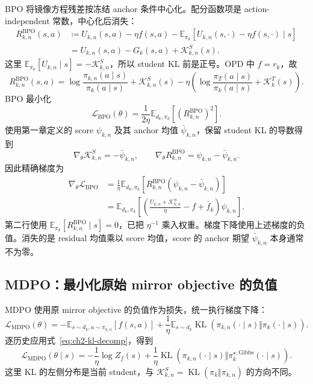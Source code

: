 BPO 将镜像方程残差按冻结 anchor 条件中心化。配分函数项是 action-independent 常数，中心化后消失：
\begin{align}
R_{k,n}^{\mathrm{BPO}}(s,a)
&\coloneqq U_{k,n}(s,a)-\eta f(s,a)
-\mathbb E_{\pi_k}[U_{k,n}(s,\cdot)-\eta f(s,\cdot)\mid s]
\label{eq:ch2-bpo-from-optimality}\\
&=U_{k,n}(s,a)-G_k(s,a)+\mathcal K_{k,n}^{S}(s).
\label{eq:ch2-bpo-expanded}
\end{align}
这里 $\mathbb E_{\pi_k}[U_{k,n}\mid s]=-\mathcal K_{k,n}^{S}$，所以 student KL 前是正号。OPD 中 $f=r_k$，故
\begin{equation}
R_{k,n}^{\mathrm{BPO}}(s,a)
=\log\frac{\pi_{k,n}(a\mid s)}{\pi_k(a\mid s)}+\mathcal K_{k,n}^{S}(s)
-\eta\left(\log\frac{\pi_T(a\mid s)}{\pi_k(a\mid s)}+\mathcal K_k^{T}(s)\right).
\label{eq:ch2-bpo-opd-expanded}
\end{equation}
BPO 最小化
\begin{equation}
\mathcal L_{\mathrm{BPO}}(\theta)
=\frac1{2\eta}\mathbb E_{d_k,\pi_k}[(R_{k,n}^{\mathrm{BPO}})^2].
\label{eq:ch2-bpo-loss-bridge}
\end{equation}
使用第一章定义的 score $\psi_{k,n}$ 及其 anchor 均值 $\bar\psi_{k,n}$，保留 student KL 的导数得到
\[
\nabla_\theta\mathcal K_{k,n}^{S}=-\bar\psi_{k,n},\qquad
\nabla_\theta R_{k,n}^{\mathrm{BPO}}=\psi_{k,n}-\bar\psi_{k,n}.
\]
因此精确梯度为
\begin{align}
\nabla_\theta\mathcal L_{\mathrm{BPO}}
&=\frac1\eta\mathbb E_{d_k,\pi_k}[R_{k,n}^{\mathrm{BPO}}(\psi_{k,n}-\bar\psi_{k,n})]
\label{eq:ch2-bpo-gradient-bridge}\\
&=\mathbb E_{d_k,\pi_k}\left[
\left(\frac{U_{k,n}+\mathcal K_{k,n}^{S}}\eta-f+\bar f_k\right)\psi_{k,n}\right].
\end{align}
第二行使用 $\mathbb E_{\pi_k}[R_{k,n}^{\mathrm{BPO}}\mid s]=0$，已把 $\eta^{-1}$ 乘入权重。梯度下降使用上述梯度的负值。消失的是 residual 均值乘以 score 均值，score 的 anchor 期望 $\bar\psi_{k,n}$ 本身通常不为零。

\subsection{MDPO：最小化原始 mirror objective 的负值}
\label{subsec:ch2-mdpo-loss-derivation}

MDPO 使用原 mirror objective 的负值作为损失，统一执行梯度下降：
\begin{equation}
\mathcal L_{\mathrm{MDPO}}(\theta)
=-\mathbb E_{s\sim d_k,a\sim\pi_{k,n}}[f(s,a)]
+\frac1\eta\mathbb E_{s\sim d_k}\operatorname{KL}(\pi_{k,n}(\cdot\mid s)\Vert\pi_k(\cdot\mid s)).
\label{eq:ch2-mdpo-objective-bridge}
\end{equation}
逐历史应用式~\eqref{eq:ch2-kl-decomp}，得到
\begin{equation}
\mathcal L_{\mathrm{MDPO}}(\theta\mid s)
=-\frac1\eta\log Z_f(s)
+\frac1\eta\operatorname{KL}(\pi_{k,n}(\cdot\mid s)\Vert\pi_k^{\star,\mathrm{Gibbs}}(\cdot\mid s)).
\label{eq:ch2-mdpo-kl-gap}
\end{equation}
这里 KL 的左侧分布是当前 student，与 $\mathcal K_{k,n}^{S}=\operatorname{KL}(\pi_k\Vert\pi_{k,n})$ 的方向不同。

